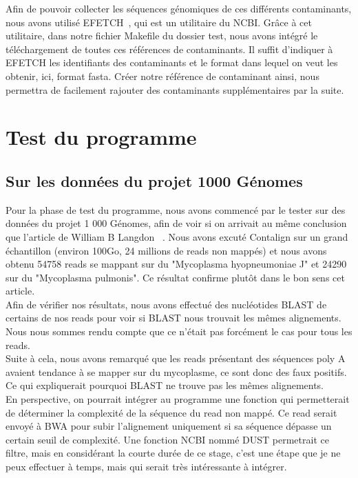 \documentclass[a4paper,12pt]{article}
\begin{document}
Afin de pouvoir collecter les séquences génomiques de ces différents contaminants, nous avons utilisé EFETCH~\cite{efetch}, qui est un utilitaire du NCBI. Grâce à cet utilitaire, dans notre fichier Makefile du dossier test, nous avons intégré le téléchargement de toutes ces références de contaminants. Il suffit d'indiquer à EFETCH les identifiants des contaminants et le format dans lequel on veut les obtenir, ici, format fasta. Créer notre référence de contaminant ainsi, nous  permettra de facilement rajouter des contaminants supplémentaires par la suite. 

\section{Test du programme}

\subsection{Sur les données du projet 1000 Génomes}

Pour la phase de test du programme, nous avons commencé par le tester sur des données du projet 1 000 Génomes, afin de voir si on arrivait au même conclusion que l'article de William B Langdon ~\cite{mycoplasme}. Nous avons excuté Contalign sur un grand échantillon (environ 100Go, 24 millions de reads non mappés) et nous avons obtenu 54758 reads se mappant sur du "Mycoplasma hyopneumoniae J" et 24290 sur du "Mycoplasma pulmonis". Ce résultat confirme plutôt dans le bon sens cet article. \\

Afin de vérifier nos résultats, nous avons effectué des nucléotides BLAST de certains de nos reads pour voir si BLAST nous trouvait les mêmes alignements. Nous nous sommes rendu compte que ce n'était pas forcément le cas pour tous les reads. \\

Suite à cela, nous avons remarqué que les reads présentant des séquences poly A avaient tendance à se mapper sur du mycoplasme, ce sont donc des faux positifs. Ce qui expliquerait pourquoi BLAST ne trouve pas les mêmes alignements. \\

En perspective, on pourrait intégrer au programme une fonction qui permetterait de déterminer la complexité de la séquence du read non mappé. Ce read serait envoyé à BWA pour subir l'alignement uniquement si sa séquence dépasse un certain seuil de complexité. Une fonction NCBI nommé DUST permetrait ce filtre, mais en considérant la courte durée de ce stage, c'est une étape que je ne peux effectuer à temps, mais qui serait très intéressante à intégrer. 
\end{document}
